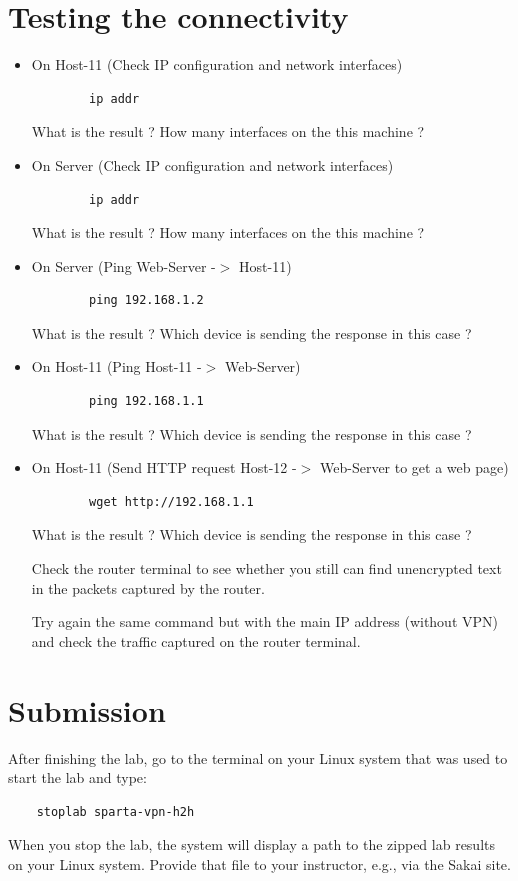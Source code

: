 \section{Testing the connectivity}
\begin{itemize}
	\item On Host-11 (Check IP configuration and network interfaces)
	\begin{verbatim}
	    ip addr
	\end{verbatim}

	What is the result ? How many interfaces on the this machine ?

	\item On Server (Check IP configuration and network interfaces)
	\begin{verbatim}
	    ip addr
	\end{verbatim}

	What is the result ? How many interfaces on the this machine ?

	\item On Server (Ping Web-Server -$>$ Host-11)
	\begin{verbatim}
	    ping 192.168.1.2
	\end{verbatim}

	What is the result ? Which device is sending the response in this case ?

	\item On Host-11 (Ping Host-11 -$>$ Web-Server)
	\begin{verbatim}
	    ping 192.168.1.1
	\end{verbatim}

	What is the result ? Which device is sending the response in this case ?

	\item On Host-11 (Send HTTP request Host-12 -$>$ Web-Server to get a web page)
	\begin{verbatim}
	    wget http://192.168.1.1
	\end{verbatim}

	What is the result ? Which device is sending the response in this case ?

	Check the router terminal to see whether you still can find unencrypted text in the packets captured by the router.

	Try again the same command but with the main IP address (without VPN) and check the traffic captured on the router terminal.

\end{itemize}

\section{Submission}
After finishing the lab, go to the terminal on your Linux system that was used to start the lab and type:
\begin{verbatim}
    stoplab sparta-vpn-h2h
\end{verbatim}
When you stop the lab, the system will display a path to the zipped lab results on your Linux system.  Provide that file to
your instructor, e.g., via the Sakai site.


